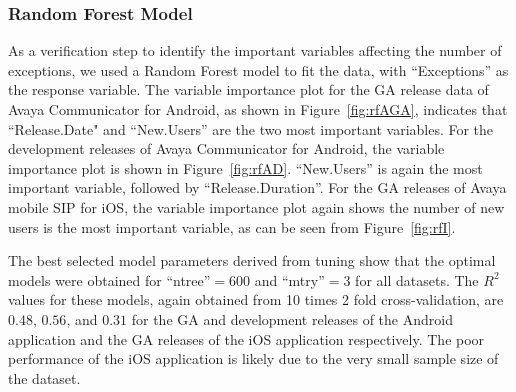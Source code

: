 \documentclass[smallcondensed]{svjour3}     %
\begin{document}
\subsubsection{Random Forest Model}
As a verification step to identify the important variables affecting the number of exceptions, we used a Random Forest model to fit the data, with ``Exceptions'' as the response variable. The variable importance plot for the GA release data of Avaya Communicator for Android, as shown in Figure~\ref{fig:rfAGA}, indicates that ``Release.Date" and ``New.Users'' are the two most important variables. For the development releases of Avaya Communicator for Android, the variable importance plot is shown in Figure~\ref{fig:rfAD}. ``New.Users'' is again the most important variable, followed by ``Release.Duration''. For the GA releases of Avaya mobile SIP for iOS, the variable importance plot again shows the number of 
new users is the most important variable, as can be seen from Figure~\ref{fig:rfI}.

The best selected model parameters derived from tuning  show that the optimal models were obtained for ``ntree''$=$600 and ``mtry''$=$3 for all datasets. The $R^2$ values for these models, again obtained from 10 times 2 fold cross-validation, are $0.48$, $0.56$, and $0.31$ for the GA and development releases of the Android application and the GA releases of the iOS application respectively. The poor performance of the iOS application is likely due to the very small sample size of the dataset.
\end{document}
